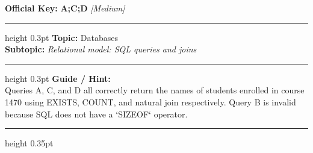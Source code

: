 \documentclass[a4paper,10pt]{article}
\begin{document}
\begin{tcolorbox}
\tcblower

\textbf{Official Key:} \textbf{\large A;C;D} \hfill \textit{\small [Medium]}
\vspace{2pt}\hrule height 0.3pt\vspace{3pt}
\textbf{Topic:} Databases \\
\textbf{Subtopic:} \textit{Relational model: SQL queries and joins}
\vspace{2pt}\hrule height 0.3pt\vspace{3pt}
\textbf{Guide / Hint:} \\
{\small Queries A, C, and D all correctly return the names of students enrolled in course 1470 using EXISTS, COUNT, and natural join respectively. Query B is invalid because SQL does not have a `SIZEOF` operator.}

\end{tcolorbox}
\vspace{6pt}\hrule height 0.35pt\vspace{6pt}
\vspace{8pt}
\end{document}
